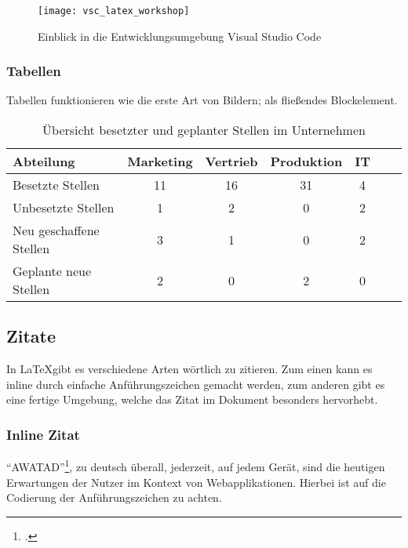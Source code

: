     \begin{figure}[tbh]
      \centering
      \texttt{[image: vsc\_latex\_workshop]}
      \caption{Einblick in die Entwicklungsumgebung Visual Studio Code}
      \label{fig_prototyp_desktop}
    \end{figure}

\subsubsection{Tabellen}
  Tabellen funktionieren wie die erste Art von Bildern; als fließendes Blockelement.

  \begin{table}[tb]
    \centering
    \begin{tabular}{@{}lcccccc@{}}
    \toprule
    Abteilung               & Marketing & Vertrieb & Produktion & IT \\ \midrule
    Besetzte Stellen        & 11        & 16       & 31         & 4  \\
    Unbesetzte Stellen      & 1         & 2        & 0          & 2  \\
    Neu geschaffene Stellen & 3         & 1        & 0          & 2  \\
    Geplante neue Stellen   & 2         & 0        & 2          & 0  \\ \bottomrule
    \end{tabular}
    \caption{Übersicht besetzter und geplanter Stellen im Unternehmen}
    \label{tbl_proglang}
  \end{table}

\subsection{Zitate}
  In \LaTeX gibt es verschiedene Arten wörtlich zu zitieren.
  Zum einen kann es inline durch einfache Anführungszeichen gemacht werden, 
  zum anderen gibt es eine fertige Umgebung, welche das Zitat im Dokument besonders hervorhebt.
  
  \subsubsection{Inline Zitat}
    "`\gls{AWATAD}"'\footcite[S. 2703]{timmerer2019journey}, zu deutsch überall, jederzeit, auf jedem Gerät,
    sind die heutigen Erwartungen der Nutzer im Kontext von Webapplikationen.
    Hierbei ist auf die Codierung der Anführungszeichen zu achten.
  
